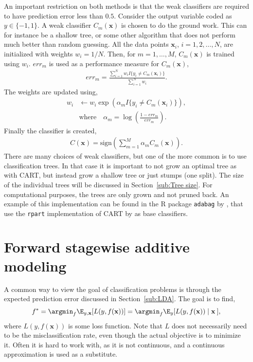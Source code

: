 An important restriction on both methods is that the weak classifiers are required to have prediction error less than $0.5$.
Consider the output variable coded as $y \in \{-1, 1\}$. A weak classifier $C_m(\mathbf{x})$ is chosen to do the ground work. This can for instance be a shallow tree, or some other algorithm that does not perform much better than random guessing. All the data points $\mathbf{x}_i$, $i = 1, 2, \ldots, N$, are initialized with weights $w_i = 1/N$. Then, for $m = 1, \ldots, M$, $C_m(\mathbf{x})$ is trained using $w_i$. $err_m$ is used as a performance measure for $C_m(\mathbf{x})$,
\begin{align}
  err_m =  \frac{\sum^{N}_{i=1} w_i I\{y_i \neq C_m(\mathbf{x}_i)\}}{\sum^{N}_{i=1} w_i}.
\end{align}
The weights are updated using, 
\begin{align}
  w_i &\leftarrow w_i \exp\left( \alpha_m I\{y_i \neq C_m(\mathbf{x}_i)\} \right), \\
  &\text{where} \quad \alpha_m = \log\left(  \frac{1-err_m}{err_m} \right).
\end{align}
Finally the classifier is created,
\begin{align}
  C( \mathbf{x}) = \text{sign}\left( \sum^{M}_{m=1} \alpha_m C_m(\mathbf{x}) \right).
\end{align}
There are many choices of weak classifiers, but one of the more common is to use classification trees. In that case it is important to not grow an optimal tree as with CART, but instead grow a shallow tree or just stumps (one split). The size of the individual trees will be discussed in Section~\ref{sub:Tree size}. For computational purposes, the trees are only grown and not pruned back.
An example of this implementation can be found in the R package \verb+adabag+ by \cite{adabag}, that use the \verb+rpart+ implementation of CART by \cite{rpart} as base classifiers.

\section{Forward stagewise additive modeling}
\label{sec:Forward stagewise additive modeling}
A common way to view the goal of classification problems is through the expected prediction error discussed in Section~\ref{sub:LDA}. The goal is to find,
\begin{align}
  \label{eq:fargmin} 
  f^* = \argmin_f \E_{y, \mathbf{x}}[L(y,f(\mathbf{x}))] = \argmin_f \E_y [L(y,f(\mathbf{x})) \mid \mathbf{x}\:] ,
\end{align}
where $L(y, f(\mathbf{x}))$ is some loss function. 
Note that $L$ does not necessarily need to be the misclassification rate, even though the actual objective is to minimize it.
Often it is hard to work with, as it is not continuous, and a continuous approximation is used as a substitute.

